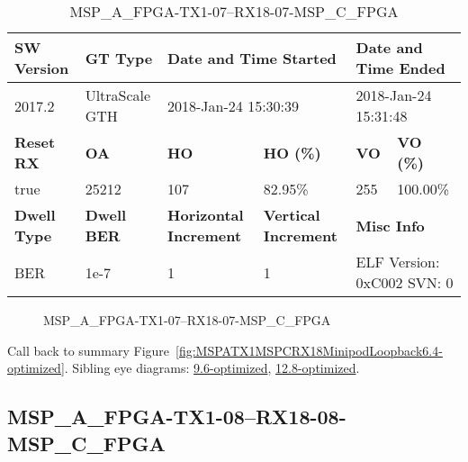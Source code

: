 \begin{table}[h]
\centering
\caption{MSP\_A\_FPGA-TX1-07--RX18-07-MSP\_C\_FPGA}
\label{tab:MSPAFPGATX107RX1807MSPCFPGA6.4-optimized}
\begin{tabular}{@{}|l|l|l|l|l|l|@{}}
\toprule
\textbf{SW Version}                & \textbf{GT Type}   & \multicolumn{2}{l|}{\textbf{Date and Time Started}}            & \multicolumn{2}{l|}{\textbf{Date and Time Ended}}        \\ \midrule
2017.2                       & UltraScale GTH          & \multicolumn{2}{l|}{2018-Jan-24 15:30:39}                   & \multicolumn{2}{l|}{2018-Jan-24 15:31:48}               \\ \midrule
\textbf{Reset RX}                  & \textbf{OA} & \textbf{HO}   & \textbf{HO (\%)} & \textbf{VO} & \textbf{VO (\%)} \\ \midrule
true & 25212        & 107          & 82.95\%        & 255        & 100.00\%       \\ \midrule
\textbf{Dwell Type}                & \textbf{Dwell BER} & \textbf{Horizontal Increment} & \textbf{Vertical Increment}    & \multicolumn{2}{l|}{\textbf{Misc Info}}                  \\ \midrule
BER                            & 1e-7        & 1        & 1           & \multicolumn{2}{l|}{ELF Version: 0xC002 SVN: 0}                         \\ \bottomrule
\end{tabular}
\end{table}

\begin{figure}[h]
\caption{MSP\_A\_FPGA-TX1-07--RX18-07-MSP\_C\_FPGA} \label{fig:MSPAFPGATX107RX1807MSPCFPGA6.4-optimized}
\end{figure}

Call back to summary Figure~\ref{fig:MSPATX1MSPCRX18MinipodLoopback6.4-optimized}.
Sibling eye diagrams: \hyperref[sec:MSPAFPGATX107RX1807MSPCFPGA9.6-optimized]{9.6-optimized}, \hyperref[sec:MSPAFPGATX107RX1807MSPCFPGA12.8-optimized]{12.8-optimized}.

\clearpage
\newpage


\subsection{MSP\_A\_FPGA-TX1-08--RX18-08-MSP\_C\_FPGA}\label{sec:MSPAFPGATX108RX1808MSPCFPGA6.4-optimized}

